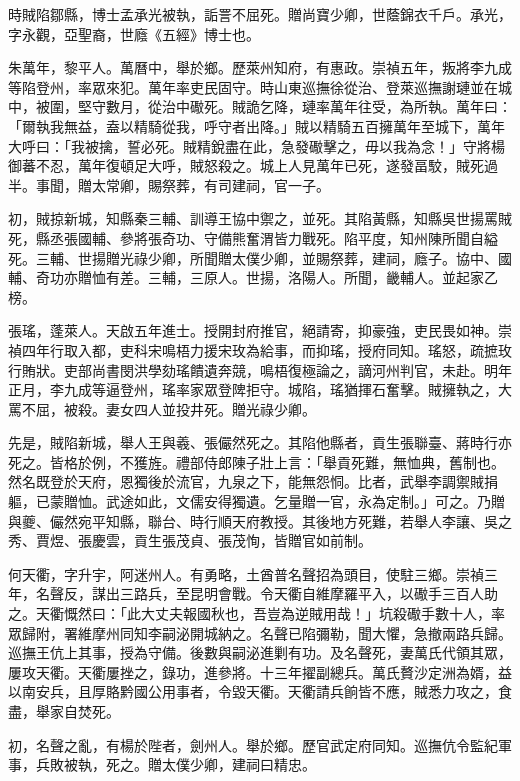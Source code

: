 \begin{pinyinscope}
時賊陷鄒縣，博士孟承光被執，詬詈不屈死。贈尚寶少卿，世蔭錦衣千戶。承光，字永觀，亞聖裔，世廕《五經》博士也。

朱萬年，黎平人。萬曆中，舉於鄉。歷萊州知府，有惠政。崇禎五年，叛將李九成等陷登州，率眾來犯。萬年率吏民固守。時山東巡撫徐從治、登萊巡撫謝璉並在城中，被圍，堅守數月，從治中礮死。賊詭乞降，璉率萬年往受，為所執。萬年曰：「爾執我無益，盍以精騎從我，呼守者出降。」賊以精騎五百擁萬年至城下，萬年大呼曰：「我被擒，誓必死。賊精銳盡在此，急發礮擊之，毋以我為念！」守將楊御蕃不忍，萬年復頓足大呼，賊怒殺之。城上人見萬年已死，遂發畐駮，賊死過半。事聞，贈太常卿，賜祭葬，有司建祠，官一子。

初，賊掠新城，知縣秦三輔、訓導王協中禦之，並死。其陷黃縣，知縣吳世揚罵賊死，縣丞張國輔、參將張奇功、守備熊奮渭皆力戰死。陷平度，知州陳所聞自縊死。三輔、世揚贈光祿少卿，所聞贈太僕少卿，並賜祭葬，建祠，廕子。協中、國輔、奇功亦贈恤有差。三輔，三原人。世揚，洛陽人。所聞，畿輔人。並起家乙榜。

張瑤，蓬萊人。天啟五年進士。授開封府推官，絕請寄，抑豪強，吏民畏如神。崇禎四年行取入都，吏科宋鳴梧力援宋玫為給事，而抑瑤，授府同知。瑤怒，疏摭玫行賄狀。吏部尚書閔洪學劾瑤饋遺奔競，鳴梧復極論之，謫河州判官，未赴。明年正月，李九成等逼登州，瑤率家眾登陴拒守。城陷，瑤猶揮石奮擊。賊擁執之，大罵不屈，被殺。妻女四人並投井死。贈光祿少卿。

先是，賊陷新城，舉人王與羲、張儼然死之。其陷他縣者，貢生張聯臺、蔣時行亦死之。皆格於例，不獲旌。禮部侍郎陳子壯上言：「舉貢死難，無恤典，舊制也。然名既登於天府，恩獨後於流官，九泉之下，能無怨恫。比者，武舉李調禦賊捐軀，已蒙贈恤。武途如此，文儒安得獨遺。乞量贈一官，永為定制。」可之。乃贈與夔、儼然宛平知縣，聯台、時行順天府教授。其後地方死難，若舉人李讓、吳之秀、賈煜、張慶雲，貢生張茂貞、張茂恂，皆贈官如前制。

何天衢，字升宇，阿迷州人。有勇略，土酋普名聲招為頭目，使駐三鄉。崇禎三年，名聲反，謀出三路兵，至昆明會戰。令天衢自維摩羅平入，以礮手三百人助之。天衢慨然曰：「此大丈夫報國秋也，吾豈為逆賊用哉！」坑殺礮手數十人，率眾歸附，署維摩州同知李嗣泌開城納之。名聲已陷彌勒，聞大懼，急撤兩路兵歸。巡撫王伉上其事，授為守備。後數與嗣泌進剿有功。及名聲死，妻萬氏代領其眾，屢攻天衢。天衢屢挫之，錄功，進參將。十三年擢副總兵。萬氏贅沙定洲為婿，益以南安兵，且厚賂黔國公用事者，令毀天衢。天衢請兵餉皆不應，賊悉力攻之，食盡，舉家自焚死。

初，名聲之亂，有楊於陛者，劍州人。舉於鄉。歷官武定府同知。巡撫伉令監紀軍事，兵敗被執，死之。贈太僕少卿，建祠曰精忠。


\end{pinyinscope}